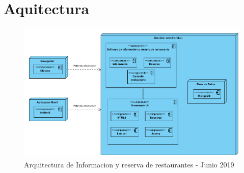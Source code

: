 
\chapter{Aquitectura}
\label{intro}


\begin{figure}
\centering
\includegraphics[scale=0.4]{chapters/img/Arquitectura.png}
\caption{Arquitectura de Informacion y reserva de restaurantes - Junio 2019 }
\end{figure}


\cleardoublepage
